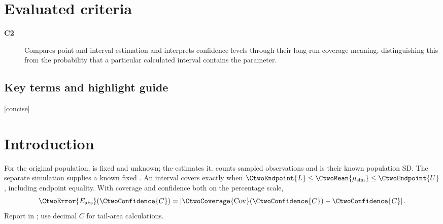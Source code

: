 \maketitle

\setcounter{tocdepth}{1}
\setcounter{secnumdepth}{2}
\label{toc}
\tableofcontents

\section*{Evaluated criteria}
\begin{description}
    \item[\textbf{C2}] Compares point and interval estimation and interprets confidence levels through their long-run coverage meaning, distinguishing this from the probability that a particular calculated interval contains the parameter.
\end{description}


\subsection*{Key terms and highlight guide}
\label{subsec:c2-key-terms}
\label{tab:highlight-legend}
[concise]

\section{Introduction}
\label{sec:introduction}

For the original population, \CtwoMean{$\mu$} is fixed and unknown; the
  estimates it.
 counts sampled observations and \CtwoSD{$\sigma$} is their known population SD.
The separate simulation supplies a known fixed .
An interval covers exactly when $\CtwoEndpoint{L}\leq\CtwoMean{\mu_{\rm sim}}\leq\CtwoEndpoint{U}$,
including endpoint equality. With coverage and confidence both on the percentage scale,
\[
\CtwoError{E_{\rm abs}}(\CtwoConfidence{C})
=\left|\CtwoCoverage{\mathrm{Cov}}(\CtwoConfidence{C})-\CtwoConfidence{C}\right|.
\]
Report  in ; use decimal $C$ for tail-area calculations.

\par

